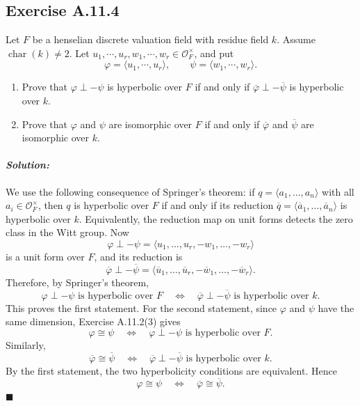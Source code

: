 \documentclass[12pt, a4paper]{article}
\newenvironment{solution}
  {\paragraph{\textit{Solution:}}\par\medskip}
  {\hfill$\blacksquare$\vspace{0.1cm}}
\begin{document}
\subsection*{Exercise A.11.4}

Let $F$ be a henselian discrete valuation field with residue field $k$. Assume $\operatorname{char}(k)\neq 2$. Let $u_1,\cdots,u_r,w_1,\cdots,w_r\in \mathcal{O}_F^{\times}$, and put
\[
    \varphi=\langle u_1,\cdots,u_r\rangle,
    \qquad
    \psi=\langle w_1,\cdots,w_r\rangle.
\]

\begin{enumerate}
    \item Prove that $\varphi\perp -\psi$ is hyperbolic over $F$ if and only if $\overline{\varphi}\perp -\overline{\psi}$ is hyperbolic over $k$.

    \item Prove that $\varphi$ and $\psi$ are isomorphic over $F$ if and only if $\overline{\varphi}$ and $\overline{\psi}$ are isomorphic over $k$.
\end{enumerate}
\begin{solution}
    We use the following consequence of Springer's theorem: if $q=\langle a_1,\dots,a_n\rangle$ with all $a_i\in \mathcal O_F^\times$, then $q$ is hyperbolic over $F$ if and only if its reduction $\overline q=\langle \overline a_1,\dots,\overline a_n\rangle$ is hyperbolic over $k$. Equivalently, the reduction map on unit forms detects the zero class in the Witt group. Now \[ \varphi\perp -\psi = \langle u_1,\dots,u_r,-w_1,\dots,-w_r\rangle \] is a unit form over $F$, and its reduction is \[ \overline\varphi\perp -\overline\psi = \langle \overline u_1,\dots,\overline u_r, -\overline w_1,\dots,-\overline w_r\rangle . \] Therefore, by Springer's theorem, \[ \varphi\perp -\psi \text{ is hyperbolic over } F \quad\Longleftrightarrow\quad \overline\varphi\perp -\overline\psi \text{ is hyperbolic over } k. \] This proves the first statement. For the second statement, since $\varphi$ and $\psi$ have the same dimension, Exercise A.11.2(3) gives \[ \varphi\cong \psi \quad\Longleftrightarrow\quad \varphi\perp -\psi \text{ is hyperbolic over } F. \] Similarly, \[ \overline\varphi\cong \overline\psi \quad\Longleftrightarrow\quad \overline\varphi\perp -\overline\psi \text{ is hyperbolic over } k. \] By the first statement, the two hyperbolicity conditions are equivalent. Hence \[ \varphi\cong \psi \quad\Longleftrightarrow\quad \overline\varphi\cong \overline\psi . \]
\end{solution}
\end{document}
